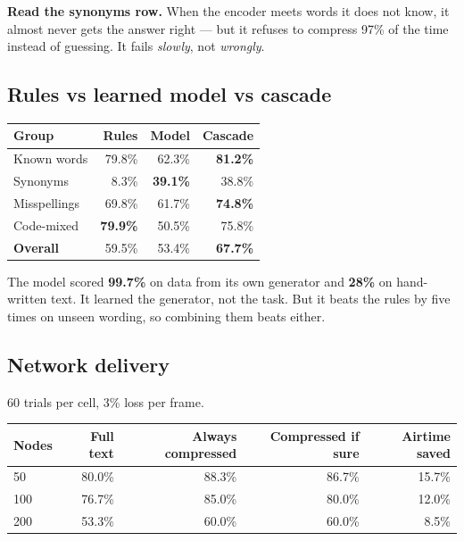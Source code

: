 \documentclass[11pt,a4paper]{article}
\begin{document}
\textbf{Read the synonyms row.} When the encoder meets words it does not know,
it almost never gets the answer right --- but it refuses to compress 97\% of
the time instead of guessing. It fails \emph{slowly}, not \emph{wrongly}.

\subsection{Rules vs learned model vs cascade}

\begin{center}
\begin{tabular}{lrrr}
\toprule
\textbf{Group} & \textbf{Rules} & \textbf{Model} & \textbf{Cascade} \\
\midrule
Known words & 79.8\% & 62.3\% & \textbf{81.2\%} \\
Synonyms & 8.3\% & \textbf{39.1\%} & 38.8\% \\
Misspellings & 69.8\% & 61.7\% & \textbf{74.8\%} \\
Code-mixed & \textbf{79.9\%} & 50.5\% & 75.8\% \\
\midrule
\textbf{Overall} & 59.5\% & 53.4\% & \textbf{67.7\%} \\
\bottomrule
\end{tabular}
\end{center}

The model scored \textbf{99.7\%} on data from its own generator and
\textbf{28\%} on hand-written text. It learned the generator, not the task.
But it beats the rules by five times on unseen wording, so combining them
beats either.

\subsection{Network delivery}

60 trials per cell, 3\% loss per frame.

\begin{center}
\begin{tabular}{lrrrr}
\toprule
\textbf{Nodes} & \textbf{Full text} & \textbf{Always compressed} & \textbf{Compressed if sure} & \textbf{Airtime saved} \\
\midrule
50  & 80.0\% & 88.3\% & 86.7\% & 15.7\% \\
100 & 76.7\% & 85.0\% & 80.0\% & 12.0\% \\
200 & 53.3\% & 60.0\% & 60.0\% & 8.5\% \\
\bottomrule
\end{tabular}
\end{center}
\end{document}
